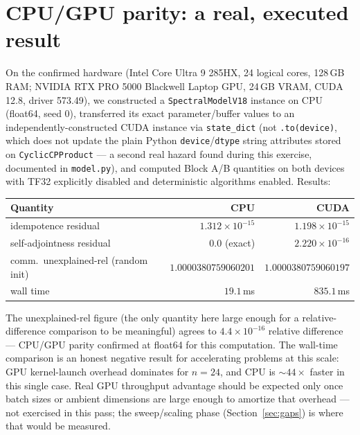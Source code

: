 \documentclass[11pt]{amsart}
\begin{document}
\section{CPU/GPU parity: a real, executed result}
On the confirmed hardware (Intel Core Ultra 9 285HX, 24 logical cores,
128\,GB RAM; NVIDIA RTX PRO 5000 Blackwell Laptop GPU, 24\,GB VRAM, CUDA
12.8, driver 573.49), we constructed a \texttt{SpectralModelV18} instance
on CPU (float64, seed 0), transferred its exact parameter/buffer values
to an independently-constructed CUDA instance via \texttt{state\_dict}
(not \texttt{.to(device)}, which does not update the plain Python
\texttt{device}/\texttt{dtype} string attributes stored on
\texttt{CyclicCPProduct} --- a second real hazard found during this
exercise, documented in \texttt{model.py}), and computed Block A/B
quantities on both devices with TF32 explicitly disabled and
deterministic algorithms enabled. Results:
\begin{center}
\small
\begin{tabular}{lrr}
\toprule
Quantity & CPU & CUDA \\
\midrule
idempotence residual & $1.312\times10^{-15}$ & $1.198\times10^{-15}$ \\
self-adjointness residual & $0.0$ (exact) & $2.220\times10^{-16}$ \\
comm.\ unexplained-rel (random init) & $1.0000380759060201$ & $1.0000380759060197$ \\
wall time & $19.1$\,ms & $835.1$\,ms \\
\bottomrule
\end{tabular}
\end{center}
The unexplained-rel figure (the only quantity here large enough for a
relative-difference comparison to be meaningful) agrees to
$4.4\times10^{-16}$ relative difference --- CPU/GPU parity confirmed at
float64 for this computation. The wall-time comparison is an honest
negative result for accelerating problems at this scale: GPU kernel-launch
overhead dominates for $n=24$, and CPU is $\sim 44\times$ faster in this
single case. Real GPU throughput advantage should be expected only once
batch sizes or ambient dimensions are large enough to amortize that
overhead --- not exercised in this pass; the sweep/scaling phase
(Section~\ref{sec:gaps}) is where that would be measured.
\end{document}

